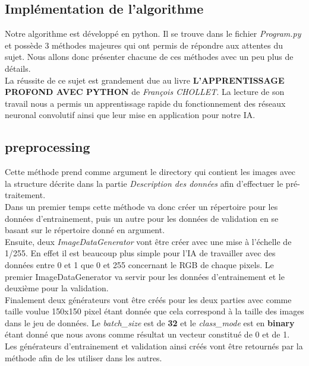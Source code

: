 \documentclass[12pt ,a4paper ]{article}
\begin{document}
\begin{multicols}{2}
\section{Implémentation de l'algorithme}
Notre algorithme est développé en python. Il se trouve dans le fichier \textit{Program.py} et possède 3 méthodes majeures qui ont permis de répondre aux attentes du sujet. Nous allons donc présenter chacune de ces méthodes avec un peu plus de détails. \\

La réussite de ce sujet est grandement due au livre \textbf{L'APPRENTISSAGE PROFOND AVEC PYTHON} de \textit{François CHOLLET}. La lecture de son travail nous a permis un apprentissage rapide du fonctionnement des réseaux neuronal convolutif ainsi que leur mise en application pour notre IA. 

\subsection{preprocessing}
Cette méthode prend comme argument le directory qui contient les images avec la structure décrite dans la partie \textit{Description des données} afin d'effectuer le pré-traitement. \\

Dans un premier temps cette méthode va donc créer un répertoire pour les données d'entrainement, puis un autre pour les données de validation en se basant sur le répertoire donné en argument.\\

Ensuite, deux \textit{ImageDataGenerator} vont être créer avec une mise à l'échelle de 1/255. En effet il est beaucoup plus simple pour l'IA de travailler avec des données entre 0 et 1 que 0 et 255 concernant le RGB de chaque pixels. Le premier ImageDataGenerator va servir pour les données d'entrainement et le deuxième pour la validation.\\

Finalement deux générateurs vont être créés pour les deux parties avec comme taille voulue 150x150 pixel étant donnée que cela correspond à la taille des images dans le jeu de données. Le \textit{batch\_size} est de \textbf{32} et le \textit{class\_mode} est en \textbf{binary} étant donné que nous avons comme résultat un vecteur constitué de 0 et de 1.\\

Les générateurs d'entrainement et validation ainsi créés vont être retournés par la méthode afin de les utiliser dans les autres. 


\end{multicols}
\end{document}
